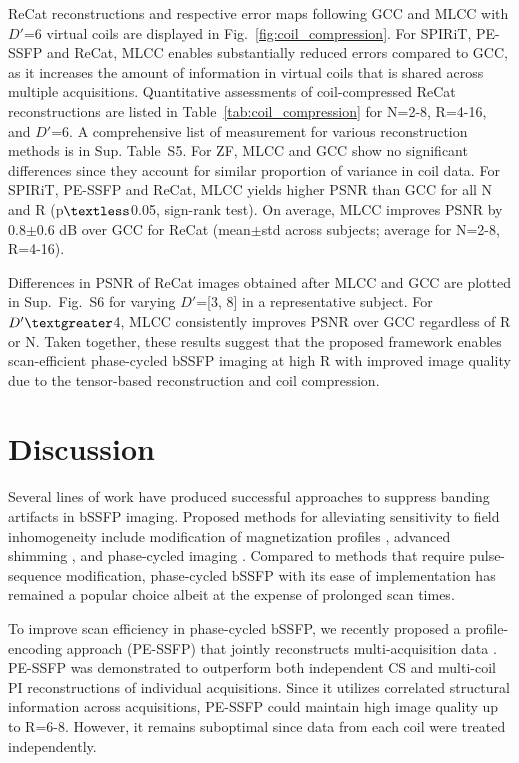 \documentclass[11pt, onecolumn]{article}
\begin{document}
ReCat reconstructions and respective error maps following GCC and MLCC with $D'$=6 virtual coils are displayed in Fig.~\ref{fig:coil_compression}. For SPIRiT, PE-SSFP and ReCat, MLCC enables substantially reduced errors compared to GCC, as it increases the amount of information in virtual coils that is shared across multiple acquisitions. Quantitative assessments of coil-compressed ReCat reconstructions are listed in Table~\ref{tab:coil_compression} for N=2-8, R=4-16, and $D'$=6. A comprehensive list of measurement for various reconstruction methods is in Sup. Table~S5. For ZF, MLCC and GCC show no significant differences since they account for similar proportion of variance in coil data. For SPIRiT, PE-SSFP and ReCat, MLCC yields higher PSNR than GCC for all N and R (p$\textless$0.05, sign-rank test). On average, MLCC improves PSNR by 0.8$\pm$0.6 dB over GCC for ReCat (mean$\pm$std across subjects; average for N=2-8, R=4-16). 

Differences in PSNR of ReCat images obtained after MLCC and GCC are plotted in Sup.~Fig.~S6 for varying $D'$=[3, 8] in a representative subject. For $D'\textgreater$4, MLCC consistently improves PSNR over GCC regardless of R or N. Taken together, these results suggest that the proposed framework enables scan-efficient phase-cycled bSSFP imaging at high R with improved image quality due to the tensor-based reconstruction and coil compression.


\clearpage
\section*{Discussion}
Several lines of work have produced successful approaches to suppress banding artifacts in bSSFP imaging. Proposed methods for alleviating sensitivity to field inhomogeneity include modification of magnetization profiles \cite{wideband,Benkert:2014hp,Sun:2015ct}, advanced shimming \cite{Lee:2009hq}, and phase-cycled imaging \cite{Bangerter04}. Compared to methods that require pulse-sequence modification, phase-cycled bSSFP with its ease of implementation has remained a popular choice albeit at the expense of prolonged scan times. 

To improve scan efficiency in phase-cycled bSSFP, we recently proposed a profile-encoding approach (PE-SSFP) that jointly reconstructs multi-acquisition data \cite{Ilicak:FJpKoYYb}. PE-SSFP was demonstrated to outperform both independent CS \cite{Cukur:2015ic} and multi-coil PI reconstructions \cite{Wang:2015hh} of individual acquisitions. Since it utilizes correlated structural information across acquisitions, PE-SSFP could maintain high image quality up to R=6-8. However, it remains suboptimal since data from each coil were treated independently. 
\end{document}
